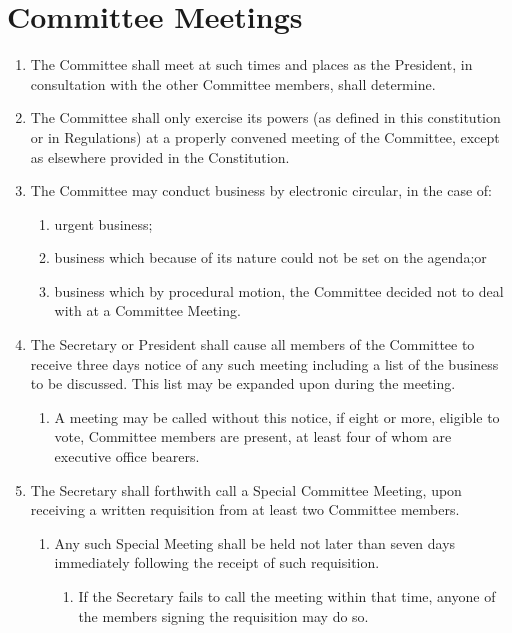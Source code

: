 \documentclass[a4paper]{article}
\begin{document}
\section{Committee Meetings} \label{sec:committee_meetings}
\begin{enumerate}
    \item The Committee shall meet at such times and places as the President, in consultation with the other Committee members, shall determine.
    \item The Committee shall only exercise its powers (as defined in this constitution or in Regulations) at a properly convened meeting of the Committee, except as elsewhere provided in the Constitution.
    \item The Committee may conduct business by electronic circular, in the case of:
          \begin{enumerate}
              \item urgent business;
              \item business which because of its nature could not be set on the agenda;or
              \item business which by procedural motion, the Committee decided not to deal with at a Committee Meeting.
          \end{enumerate}
    \item The Secretary or President shall cause all members of the Committee to receive three days notice of any such meeting including a list of the business to be discussed. This list may be expanded upon during the meeting.
          \begin{enumerate}
              \item A meeting may be called without this notice, if eight or more, eligible to vote, Committee members are present, at least four of whom are executive office bearers.
          \end{enumerate}
    \item The Secretary shall forthwith call a Special Committee Meeting, upon receiving a written requisition from at least two Committee members.
          \begin{enumerate}
              \item Any such Special Meeting shall be held not later than seven days immediately following the receipt of such requisition.
                    \begin{enumerate}
                        \item If the Secretary fails to call the meeting within that time, anyone of the members signing the requisition may do so.

\end{enumerate}
\end{enumerate}
\end{enumerate}
\end{document}
